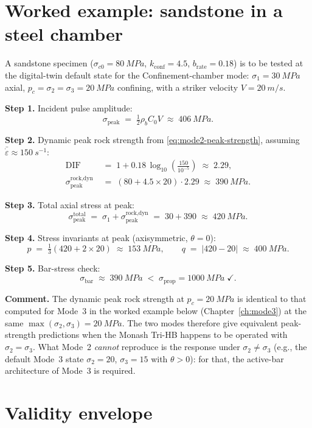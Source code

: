 \documentclass[11pt,a4paper,openany]{book}
\providecommand{\SI}[2]{\qty{#1}{#2}}
\theoremstyle{handbook}
\newcommand{\sig}{\sigma}
\newcommand{\eps}{\varepsilon}
\newcommand{\epsdot}{\dot\eps}
\newcommand{\Cz}{C_0}
\newcommand{\sigprop}{\sig_{\text{prop}}}
\newcommand{\sigpeak}{\sig_{\text{peak}}}
\begin{document}
\section{Worked example: sandstone in a steel chamber}

A sandstone specimen ($\sig_{c0}=\SI{80}{MPa}$, $k_{\text{conf}}=4.5$,
$b_{\text{rate}}=0.18$) is to be tested at the digital-twin default
state for the Confinement-chamber mode: $\sig_1=\SI{30}{MPa}$ axial,
$p_c=\sig_2=\sig_3=\SI{20}{MPa}$ confining, with a striker velocity
$V=\SI{20}{m/s}$.

\textbf{Step 1.} Incident pulse amplitude:
\[
  \sigpeak \;=\; \tfrac{1}{2}\rho_b\Cz V \;\approx\; \SI{406}{MPa}.
\]

\textbf{Step 2.} Dynamic peak rock strength from
\eqref{eq:mode2-peak-strength}, assuming
$\bar\epsdot\approx\SI{150}{s^{-1}}$:
\begin{align*}
  \text{DIF} &\;=\; 1 + 0.18\,\log_{10}\!\left(\frac{150}{10^{-5}}\right)
              \;\approx\; 2.29,\\
  \sig_{\text{peak}}^{\text{rock,dyn}}
    &\;=\; (80 + 4.5\times 20)\cdot 2.29 \;\approx\; \SI{390}{MPa}.
\end{align*}

\textbf{Step 3.} Total axial stress at peak:
\[
  \sigpeak^{\text{total}} \;=\; \sig_1 + \sig_{\text{peak}}^{\text{rock,dyn}}
                           \;=\; 30 + 390 \;\approx\; \SI{420}{MPa}.
\]

\textbf{Step 4.} Stress invariants at peak (axisymmetric, $\theta=0$):
\[
  p \;=\; \tfrac{1}{3}(420 + 2\times 20) \;\approx\; \SI{153}{MPa},
  \qquad
  q \;=\; |420-20| \;\approx\; \SI{400}{MPa}.
\]

\textbf{Step 5.} Bar-stress check:
\[
  \sig_{\text{bar}} \;\approx\; \SI{390}{MPa} \;<\; \sigprop=\SI{1000}{MPa}\;\checkmark.
\]

\textbf{Comment.} The dynamic peak rock strength at $p_c=\SI{20}{MPa}$
is identical to that computed for Mode~3 in the worked example below
(Chapter~\ref{ch:mode3}) at the same $\max(\sig_2,\sig_3)=\SI{20}{MPa}$.
The two modes therefore give equivalent peak-strength predictions when
the Monash Tri-HB happens to be operated with $\sig_2=\sig_3$. What
Mode~2 \emph{cannot} reproduce is the response under
$\sig_2\neq\sig_3$ (e.g., the default Mode~3 state $\sig_2=20$, $\sig_3=15$
with $\theta>0$): for that, the active-bar architecture of Mode~3 is
required.

\section{Validity envelope}
\end{document}
